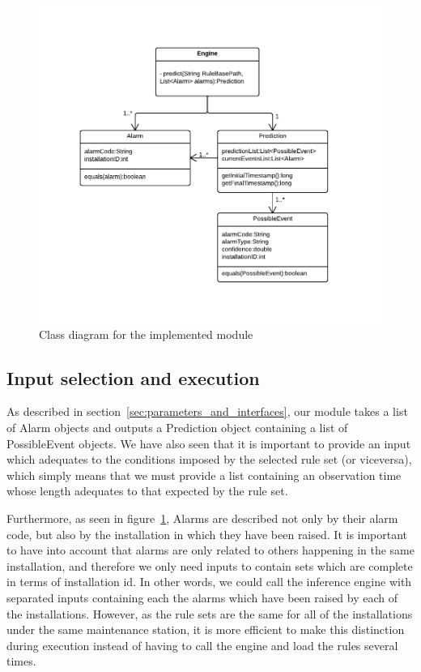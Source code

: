 \begin{figure}[hbtp]
\includegraphics[width=\textwidth]{img/prototypeArchitecture.pdf}
\caption{Class diagram for the implemented module} \label{fig:prototypeArchitecture}
\end{figure}

\subsection{Input selection and execution}
As described in section~\ref{sec:parameters_and_interfaces}, our module takes a list of Alarm objects and outputs a Prediction object containing a list of PossibleEvent objects. We have also seen that it is important to provide an input which adequates to the conditions imposed by the selected rule set (or viceversa), which simply means that we must provide a list containing an observation time whose length adequates to that expected by the rule set.

Furthermore, as seen in figure~\ref{fig:prototypeArchitecture}, Alarms are described not only by their alarm code, but also by the installation in which they have been raised. It is important to have into account that alarms are only related to others happening in the same installation, and therefore we only need inputs to contain sets which are complete in terms of installation id. In other words, we could call the inference engine with separated inputs containing each the alarms which have been raised by each of the installations. However, as the rule sets are the same for all of the installations under the same maintenance station, it is more efficient to make this distinction during execution instead of having to call the engine and load the rules several times.

